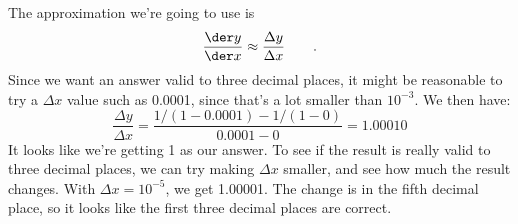 The approximation we're going to use is
\begin{equation*}
  \frac{\der y}{\der x} \approx \frac{\Delta y}{\Delta x} \qquad .
\end{equation*}
Since we want an answer valid to three decimal places, it might
be reasonable to try a $\Delta x$ value such as 0.0001, since that's
a lot smaller than $10^{-3}$. We then have:
\begin{equation*}
  \frac{\Delta y}{\Delta x} = \frac{1/(1-0.0001)-1/(1-0)}{0.0001-0} = 1.00010
\end{equation*}
It looks like we're getting 1 as our answer. To see if the result is really
valid to three decimal places, we can try making $\Delta x$ smaller, and see how
much the result changes. With $\Delta x=10^{-5}$, we get  1.00001. The change
is in the fifth decimal place, so it looks like the first three decimal places
are correct.

